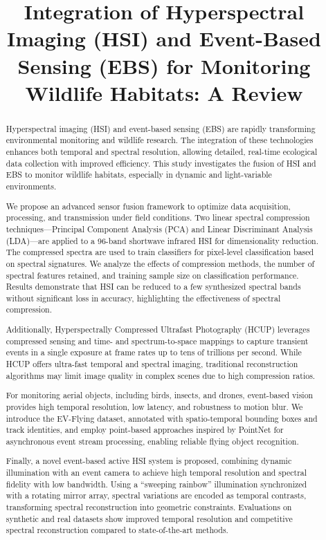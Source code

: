 \documentclass[conference]{IEEEtran}
\title{Integration of Hyperspectral Imaging (HSI) and Event-Based Sensing (EBS) for Monitoring Wildlife Habitats: A Review}
\author{
  \IEEEauthorblockN{Mohammed Alaa Ala'anzy\textsuperscript{1}, Abdelshakhid Zaidinov\textsuperscript{2}}
  \IEEEauthorblockA{\textsuperscript{1}\textit{Dept. of Computer Science}, SDU University, Kaskelen, Kazakhstan\\
  m.alanzy@gmail.com (Corresponding author)}
  \IEEEauthorblockA{\textsuperscript{2}\textit{Dept. of Computer Science}, SDU University, Kaskelen, Kazakhstan\\
  180107011@stu.sdu.edu.kz}
 
}
\begin{document}
\maketitle

\begin{abstract}
Hyperspectral imaging (HSI) and event-based sensing (EBS) are rapidly transforming environmental monitoring and wildlife research. The integration of these technologies enhances both temporal and spectral resolution, allowing detailed, real-time ecological data collection with improved efficiency. This study investigates the fusion of HSI and EBS to monitor wildlife habitats, especially in dynamic and light-variable environments.

We propose an advanced sensor fusion framework to optimize data acquisition, processing, and transmission under field conditions. Two linear spectral compression techniques—Principal Component Analysis (PCA) and Linear Discriminant Analysis (LDA)—are applied to a 96-band shortwave infrared HSI for dimensionality reduction. The compressed spectra are used to train classifiers for pixel-level classification based on spectral signatures. We analyze the effects of compression methods, the number of spectral features retained, and training sample size on classification performance. Results demonstrate that HSI can be reduced to a few synthesized spectral bands without significant loss in accuracy, highlighting the effectiveness of spectral compression.

Additionally, Hyperspectrally Compressed Ultrafast Photography (HCUP) leverages compressed sensing and time- and spectrum-to-space mappings to capture transient events in a single exposure at frame rates up to tens of trillions per second. While HCUP offers ultra-fast temporal and spectral imaging, traditional reconstruction algorithms may limit image quality in complex scenes due to high compression ratios.

For monitoring aerial objects, including birds, insects, and drones, event-based vision provides high temporal resolution, low latency, and robustness to motion blur. We introduce the EV-Flying dataset, annotated with spatio-temporal bounding boxes and track identities, and employ point-based approaches inspired by PointNet for asynchronous event stream processing, enabling reliable flying object recognition.

Finally, a novel event-based active HSI system is proposed, combining dynamic illumination with an event camera to achieve high temporal resolution and spectral fidelity with low bandwidth. Using a “sweeping rainbow” illumination synchronized with a rotating mirror array, spectral variations are encoded as temporal contrasts, transforming spectral reconstruction into geometric constraints. Evaluations on synthetic and real datasets show improved temporal resolution and competitive spectral reconstruction compared to state-of-the-art methods.
\end{abstract}
\end{document}
